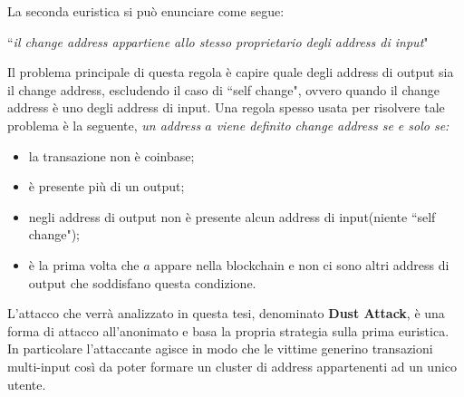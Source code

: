 La seconda euristica si può enunciare come segue: 
\begin{center}
    ``\textit{il change address appartiene allo stesso proprietario degli address di input}"
\end{center}

Il problema principale di questa regola è capire quale degli address di output sia il change address, escludendo il caso di ``self change", ovvero quando il change address è uno degli address di input. Una regola spesso usata per risolvere tale problema è la seguente, \emph{un address $a$ viene definito change address se e solo se:}
\begin{itemize}
    \item la transazione non è coinbase;
    \item è presente più di un output;
    \item negli address di output non è presente alcun address di input(niente ``self change");
    \item è la prima volta che $a$ appare nella blockchain e non ci sono altri address di output che soddisfano questa condizione.
\end{itemize}

L'attacco che verrà analizzato in questa tesi, denominato \textbf{Dust Attack}, è una forma di attacco all'anonimato e basa la propria strategia sulla prima euristica. In particolare l'attaccante agisce in modo che le vittime generino transazioni multi-input così da poter formare un cluster di address appartenenti ad un unico utente.






